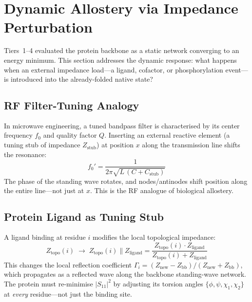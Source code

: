 \section{Dynamic Allostery via Impedance Perturbation}
\label{sec:allostery}

Tiers~1--4 evaluated the protein backbone as a static network converging
to an energy minimum.  This section addresses the dynamic response:
what happens when an external impedance load---a ligand, cofactor, or
phosphorylation event---is introduced into the already-folded native
state?

\subsection{RF Filter-Tuning Analogy}
\label{sec:rf_analogy}

In microwave engineering, a tuned bandpass filter is characterised by
its center frequency $f_0$ and quality factor $Q$.  Inserting an
external reactive element (a tuning stub of impedance $Z_\text{stub}$)
at position $x$ along the transmission line shifts the resonance:
\begin{equation}
    f_0' = \frac{1}{2\pi\sqrt{L\,(C + C_\text{stub})}}
    \label{eq:rf_detune}
\end{equation}
The phase of the standing wave rotates, and nodes/antinodes shift
position along the entire line---not just at $x$.  This is the RF
analogue of biological allostery.

\subsection{Protein Ligand as Tuning Stub}
\label{sec:ligand_stub}

A ligand binding at residue $i$ modifies the local topological
impedance:
\begin{equation}
    Z_\text{topo}(i) \;\longrightarrow\;
    Z_\text{topo}(i) \parallel Z_\text{ligand}
    = \frac{Z_\text{topo}(i)\cdot Z_\text{ligand}}
          {Z_\text{topo}(i) + Z_\text{ligand}}
    \label{eq:z_ligand}
\end{equation}
This changes the local reflection coefficient
$\Gamma_i = (Z_\text{new} - Z_\text{bb})/(Z_\text{new} + Z_\text{bb})$,
which propagates as a reflected wave along the backbone standing-wave
network.  The protein must re-minimise $|S_{11}|^2$ by adjusting its
torsion angles $\{\phi, \psi, \chi_1, \chi_2\}$ at \emph{every}
residue---not just the binding site.

